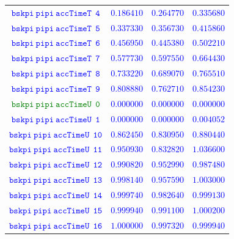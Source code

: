 \documentclass[10pt,a4paper]{article}
\begin{document}
\begin{table}[h!]
{\begin{tabular}{cccc}
\textcolor{blue}{$\mathtt{bskpi~pipi~accTimeT~~4}$} & \textcolor{blue}{$0.186410$}& \textcolor{blue}{$0.264770$}& \textcolor{blue}{$0.335680$}\\
\textcolor{blue}{$\mathtt{bskpi~pipi~accTimeT~~5}$} & \textcolor{blue}{$0.337330$}& \textcolor{blue}{$0.356730$}& \textcolor{blue}{$0.415860$}\\
\textcolor{blue}{$\mathtt{bskpi~pipi~accTimeT~~6}$} & \textcolor{blue}{$0.456950$}& \textcolor{blue}{$0.445380$}& \textcolor{blue}{$0.502210$}\\
\textcolor{blue}{$\mathtt{bskpi~pipi~accTimeT~~7}$} & \textcolor{blue}{$0.577730$}& \textcolor{blue}{$0.597550$}& \textcolor{blue}{$0.664430$}\\
\textcolor{blue}{$\mathtt{bskpi~pipi~accTimeT~~8}$} & \textcolor{blue}{$0.733220$}& \textcolor{blue}{$0.689070$}& \textcolor{blue}{$0.765510$}\\
\textcolor{blue}{$\mathtt{bskpi~pipi~accTimeT~~9}$} & \textcolor{blue}{$0.808880$}& \textcolor{blue}{$0.762710$}& \textcolor{blue}{$0.854230$}\\
\textcolor{Green}{$\mathtt{bskpi~pipi~accTimeU~~0}$} & \textcolor{blue}{$0.000000$}& \textcolor{blue}{$0.000000$}& \textcolor{blue}{$0.000000$}\\
\textcolor{blue}{$\mathtt{bskpi~pipi~accTimeU~~1}$} & \textcolor{blue}{$0.000000$}& \textcolor{blue}{$0.000000$}& \textcolor{blue}{$0.004052$}\\
\textcolor{blue}{$\mathtt{bskpi~pipi~accTimeU~~10}$} & \textcolor{blue}{$0.862450$}& \textcolor{blue}{$0.830950$}& \textcolor{blue}{$0.880440$}\\
\textcolor{blue}{$\mathtt{bskpi~pipi~accTimeU~~11}$} & \textcolor{blue}{$0.950930$}& \textcolor{blue}{$0.832820$}& \textcolor{blue}{$1.036600$}\\
\textcolor{blue}{$\mathtt{bskpi~pipi~accTimeU~~12}$} & \textcolor{blue}{$0.990820$}& \textcolor{blue}{$0.952990$}& \textcolor{blue}{$0.987480$}\\
\textcolor{blue}{$\mathtt{bskpi~pipi~accTimeU~~13}$} & \textcolor{blue}{$0.998140$}& \textcolor{blue}{$0.957590$}& \textcolor{blue}{$1.003000$}\\
\textcolor{blue}{$\mathtt{bskpi~pipi~accTimeU~~14}$} & \textcolor{blue}{$0.999740$}& \textcolor{blue}{$0.982640$}& \textcolor{blue}{$0.999130$}\\
\textcolor{blue}{$\mathtt{bskpi~pipi~accTimeU~~15}$} & \textcolor{blue}{$0.999940$}& \textcolor{blue}{$0.991100$}& \textcolor{blue}{$1.000200$}\\
\textcolor{blue}{$\mathtt{bskpi~pipi~accTimeU~~16}$} & \textcolor{blue}{$1.000000$}& \textcolor{blue}{$0.997320$}& \textcolor{blue}{$0.999940$}\\

\end{tabular}}
\end{table}
\end{document}
